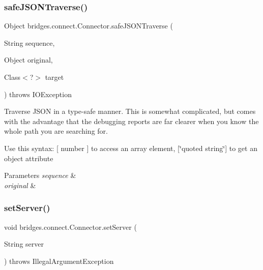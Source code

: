 \mbox{\label{classbridges_1_1connect_1_1_connector_ab7d1d242fbf9acade316650e54a3d020}} 
\subsubsection{\texorpdfstring{safeJSONTraverse()}{safeJSONTraverse()}}
{\footnotesize\ttfamily Object bridges.\+connect.\+Connector.\+safe\+J\+S\+O\+N\+Traverse (\begin{DoxyParamCaption}\item[{String}]{sequence,  }\item[{Object}]{original,  }\item[{Class$<$?$>$}]{target }\end{DoxyParamCaption}) throws I\+O\+Exception}

Traverse J\+S\+ON in a type-\/safe manner. This is somewhat complicated, but comes with the advantage that the debugging reports are far clearer when you know the whole path you are searching for.

Use this syntax\+: \mbox{[} number \mbox{]} to access an array element, \mbox{[}\char`\"{}quoted string\char`\"{}\mbox{]} to get an object attribute


\begin{DoxyParams}{Parameters}
{\em sequence} & \\
\hline
{\em original} & \\
\hline
\end{DoxyParams}
\mbox{\label{classbridges_1_1connect_1_1_connector_acab24a8c4ffd3349ec67536552fb30b3}} 
\subsubsection{\texorpdfstring{setServer()}{setServer()}}
{\footnotesize\ttfamily void bridges.\+connect.\+Connector.\+set\+Server (\begin{DoxyParamCaption}\item[{String}]{server }\end{DoxyParamCaption}) throws Illegal\+Argument\+Exception}

